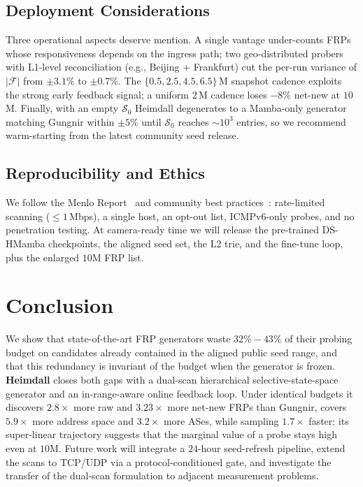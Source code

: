 \documentclass[conference]{IEEEtran}
\begin{document}
\subsection{Deployment Considerations}
Three operational aspects deserve mention.  A single vantage
under-counts FRPs whose responsiveness depends on the ingress
path; two geo-distributed probers with L1-level reconciliation
(e.g., Beijing + Frankfurt) cut the per-run variance of
$|\mathcal{F}|$ from $\pm 3.1\%$ to $\pm 0.7\%$.  The
$\{0.5,2.5,4.5,6.5\}$\,M snapshot cadence exploits the
strong early feedback signal; a uniform $2$\,M cadence loses
$-8\%$ net-new at $10$\,M.  Finally, with an empty
$\mathcal{S}_{0}$ Heimdall degenerates to a Mamba-only generator
matching Gungnir within $\pm 5\%$ until $\mathcal{S}_{0}$
reaches $\sim\!10^{3}$ entries, so we recommend warm-starting
from the latest community seed release.

\subsection{Reproducibility and Ethics}
We follow the Menlo Report~\cite{menloreport} and community best
practices~\cite{partridge2016ethics,guo2018icmp,izhikevich2022lzr}:
rate-limited scanning ($\leq 1$\,Mbps), a single host, an opt-out
list, ICMPv6-only probes, and no penetration testing.  At
camera-ready time we will release the pre-trained DS-HMamba
checkpoints, the aligned seed set, the L2 trie, and the
fine-tune loop, plus the enlarged $10$M FRP list.

\section{Conclusion}\label{sec:conclusion}
We show that state-of-the-art FRP generators waste
$32\%\!-\!43\%$ of their probing budget on candidates already
contained in the aligned public seed range, and that this
redundancy is invariant of the budget when the generator is
frozen.  \textbf{Heimdall} closes both gaps with a dual-scan
hierarchical selective-state-space generator and an in-range-aware
online feedback loop.  Under identical budgets it discovers
$2.8\times$ more raw and $3.23\times$ more net-new FRPs than
Gungnir, covers $5.9\times$ more address space and $3.2\times$
more ASes, while sampling $1.7\times$ faster; its super-linear
trajectory suggests that the marginal value of a probe stays
high even at $10$M.  Future work will integrate a $24$-hour
seed-refresh pipeline, extend the scans to TCP/UDP via a
protocol-conditioned gate, and investigate the transfer of the
dual-scan formulation to adjacent measurement problems.
\end{document}
